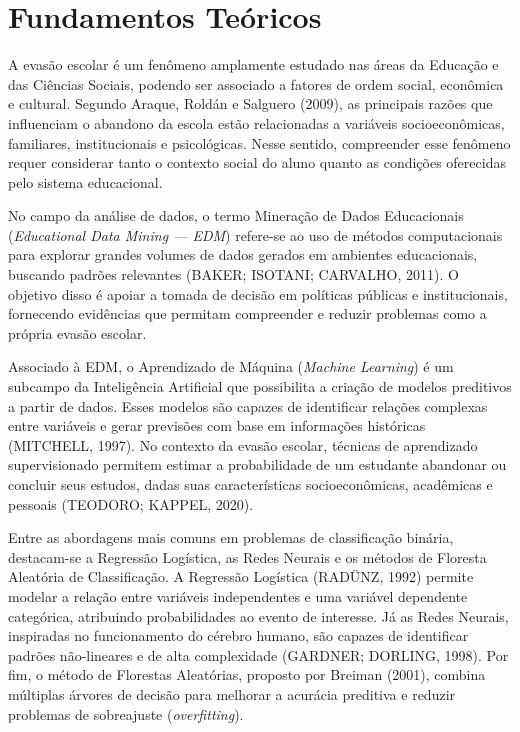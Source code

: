 \documentclass[english, spanish, brazilian]{RBIEarticle} %
\begin{document}
\section{Fundamentos Teóricos}

A evasão escolar é um fenômeno amplamente estudado nas áreas da Educação e das Ciências Sociais, podendo ser associado a fatores de ordem social, econômica e cultural. Segundo Araque, Roldán e Salguero (2009), as principais razões que influenciam o abandono da escola estão relacionadas a variáveis socioeconômicas, familiares, institucionais e psicológicas. Nesse sentido, compreender esse fenômeno requer considerar tanto o contexto social do aluno quanto as condições oferecidas pelo sistema educacional. 

No campo da análise de dados, o termo Mineração de Dados Educacionais (\textit{Educational Data Mining — EDM}) refere-se ao uso de métodos computacionais para explorar grandes volumes de dados gerados em ambientes educacionais, buscando padrões relevantes (BAKER; ISOTANI; CARVALHO, 2011). O objetivo disso é apoiar a tomada de decisão em políticas públicas e institucionais, fornecendo evidências que permitam compreender e reduzir problemas como a própria evasão escolar.

Associado à EDM, o Aprendizado de Máquina (\textit{Machine Learning}) é um subcampo da Inteligência Artificial que possibilita a criação de modelos preditivos a partir de dados. Esses modelos são capazes de identificar relações complexas entre variáveis e gerar previsões com base em informações históricas (MITCHELL, 1997). No contexto da evasão escolar, técnicas de aprendizado supervisionado permitem estimar a probabilidade de um estudante abandonar ou concluir seus estudos, dadas suas características socioeconômicas, acadêmicas e pessoais (TEODORO; KAPPEL, 2020).

Entre as abordagens mais comuns em problemas de classificação binária, destacam-se a Regressão Logística, as Redes Neurais e os métodos de Floresta Aleatória de Classificação. A Regressão Logística (RADÜNZ, 1992) permite modelar a relação entre variáveis independentes e uma variável dependente categórica, atribuindo probabilidades ao evento de interesse. Já as Redes Neurais, inspiradas no funcionamento do cérebro humano, são capazes de identificar padrões não-lineares e de alta complexidade (GARDNER; DORLING, 1998). Por fim, o método de Florestas Aleatórias, proposto por Breiman (2001), combina múltiplas árvores de decisão para melhorar a acurácia preditiva e reduzir problemas de sobreajuste (\textit{overfitting}).
\end{document}
